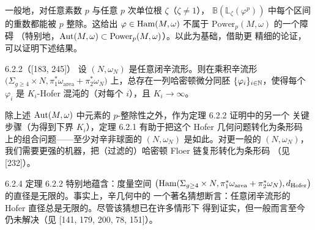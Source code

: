 一般地，对任意素数 $p$ 与任意 $p$ 次单位根 $\zeta$（$\zeta\ne 1$），
$\mathbb{B}(\mathbb{L}_\zeta(\varphi^p))$ 中每个区间的重数都能被 $p$ 整除。这给出
$\varphi\in\operatorname{Ham}(M,\omega)$ 不属于 $\mathrm{Power}_p(M,\omega)$ 的一个障碍
（特别地，$\operatorname{Aut}(M,\omega)\subset\mathrm{Power}_p(M,\omega)$）。以此为基础，借助更
精细的论证，可以证明下述结果。

\begin{wthm}{6.2.2（[183, 245]）}
  设 $(N,\omega_N)$ 是任意闭辛流形。则在乘积辛流形
  $\bigl(\Sigma_{g\ge 4}\times N,\pi_1^*\omega_{\mathrm{area}}
  +\pi_2^*\omega_N\bigr)$ 上，总存在一列哈密顿微分同胚
  $\{\varphi_i\}_{i\in\mathbb{N}}$，使得每个 $\varphi_i$ 是 $K_i$-Hofer 混沌的（对每个
  $i$），且 $K_i\to\infty$。
\end{wthm}

除上述 $\operatorname{Aut}(M,\omega)$ 中元素的 $p$-整除性之外，作为定理 6.2.2 证明中的另一个
关键步骤（为得到下界 $K_i$），定理 6.2.1 有助于把这个 Hofer 几何问题转化为条形码
上的组合问题——至少对辛非球面的 $(N,\omega_N)$ 是如此。对更一般的
$(N,\omega_N)$，我们需要更强的机器，把（过滤的）哈密顿 Floer 链复形转化为条形码
（见 [232]）。

\begin{wrem}{6.2.4}
  定理 6.2.2 特别地蕴含：度量空间
  $\bigl(\operatorname{Ham}(\Sigma_{g\ge 4}\times N,\pi_1^*\omega_{\mathrm{area}}
  +\pi_2^*\omega_N),d_{\mathrm{Hofer}}\bigr)$ 的直径是无限的。事实上，辛几何中的
  一个著名猜想断言：任意闭辛流形的 Hofer 直径总是无限的。尽管该猜想已在许多情形下
  得到证实，但一般而言至今仍未解决（见 [141, 179, 200, 78, 151]）。
\end{wrem}

